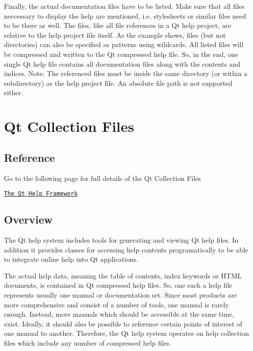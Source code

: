 Finally, the actual documentation files have to be listed. Make sure that all files neccessary to display the help are mentioned, i.\-e. stylesheets or similar files need to be there as well. The files, like all file references in a Qt help project, are relative to the help project file itself. As the example shows, files (but not directories) can also be specified as patterns using wildcards. All listed files will be compressed and written to the Qt compressed help file. So, in the end, one single Qt help file contains all documentation files along with the contents and indices. Note\-: The referenced files must be inside the same directory (or within a subdirectory) as the help project file. An absolute file path is not supported either. \hypertarget{collection}{}\section{Qt Collection Files}\label{collection}
\hypertarget{collection_collection_reference}{}\subsection{Reference}\label{collection_collection_reference}
Go to the following page for full details of the Qt Collection Files

\href{*http://qt-project.org/doc/qt-4.8/qthelp-framework.html#creating-a-qt-help-collection}{\tt The Qt Help Framework}\hypertarget{collection_colection_overview}{}\subsection{Overview}\label{collection_colection_overview}
The Qt help system includes tools for generating and viewing Qt help files. In addition it provides classes for accessing help contents programatically to be able to integrate online help into Qt applications.

The actual help data, meaning the table of contents, index keywords or H\-T\-M\-L documents, is contained in Qt compressed help files. So, one such a help file represents usually one manual or documentation set. Since most products are more comprehensive and consist of a number of tools, one manual is rarely enough. Instead, more manuals which should be accessible at the same time, exist. Ideally, it should also be possible to reference certain points of interest of one manual to another. Therefore, the Qt help system operates on help collection files which include any number of compressed help files.

